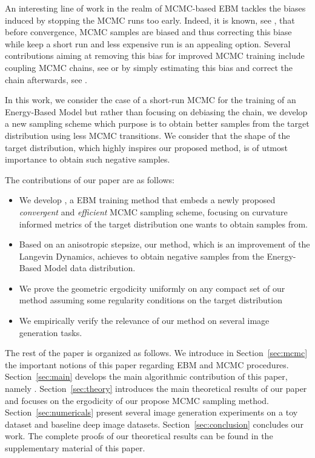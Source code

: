 \documentclass[10pt,twocolumn,letterpaper]{article}
\begin{document}
An interesting line of work in the realm of MCMC-based EBM tackles the biases induced by stopping the MCMC runs too early. 
Indeed, it is known, see \cite{meyn2012markov}, that before convergence, MCMC samples are biased and thus correcting this biase while keep a short run and less expensive run is an appealing option.
Several contributions aiming at removing this bias for improved MCMC training include coupling MCMC chains, see \cite{qiu2019unbiased,jacob2020unbiased} or by simply estimating this bias and correct the chain afterwards, see \cite{du2020improved}.


In this work, we consider the case of a short-run MCMC for the training of an Energy-Based Model but rather than focusing on debiasing the chain, we develop a new sampling scheme which purpose is to obtain better samples from the target distribution using less MCMC transitions.
We consider that the shape of the target distribution, which highly inspires our proposed method, is of utmost importance to obtain such negative samples.

The contributions of our paper are as follows:

\begin{itemize}
\item We develop \algo, a EBM training method that embeds a newly proposed \emph{convergent} and \emph{efficient} MCMC sampling scheme, focusing on curvature informed metrics of the target distribution one wants to obtain samples from.
\item Based on an anisotropic stepsize, our method, which is an improvement of the Langevin Dynamics, achieves to obtain negative samples from the Energy-Based Model data distribution.
\item We prove the geometric ergodicity uniformly on any compact set of our method assuming some regularity conditions on the target distribution
\item We empirically verify the relevance of our method on several image generation tasks.
\end{itemize}

The rest of the paper is organized as follows.
We introduce in Section~\ref{sec:mcmc} the important notions of this paper regarding EBM and MCMC procedures.
Section~\ref{sec:main} develops the main algorithmic contribution of this paper, namely \algo.
Section~\ref{sec:theory} introduces the main theoretical results of our paper and focuses on the ergodicity of our propose MCMC sampling method.
Section~\ref{sec:numericals} present several image generation experiments on a toy dataset and baseline deep image datasets.
 Section~\ref{sec:conclusion} concludes our work.
The complete proofs of our theoretical results can be found in the supplementary material of this paper.
\end{document}
